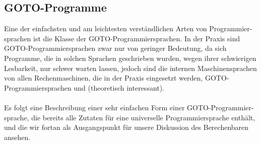 \documentclass[11pt,a4paper,leqno]{report}
\numberwithin{equation}{chapter}
\begin{document}
\subsection{GOTO-Programme}
Eine der einfachsten und am leichtesten verständlichen Arten von Programmier- sprachen ist die Klasse der GOTO-Programmiersprachen. In der Praxis sind GOTO-Programmiersprachen zwar nur von geringer Bedeutung, da sich Programme, die in solchen Sprachen geschrieben wurden, wegen ihrer schwierigen Lesbarkeit, nur schwer warten lassen, jedoch sind die internen Maschinensprachen von allen Rechenmaschinen, die in der Praxis eingesetzt werden, GOTO-Programmiersprachen und (theoretisch interessant).\\
\\
Es folgt eine Beschreibung einer sehr einfachen Form einer GOTO-Programmier- sprache, die bereits alle Zutaten für eine universelle Programmiersprache enthält, und die wir fortan als Ausgangspunkt für unsere Diskussion des Berechenbaren ansehen.
\end{document}
